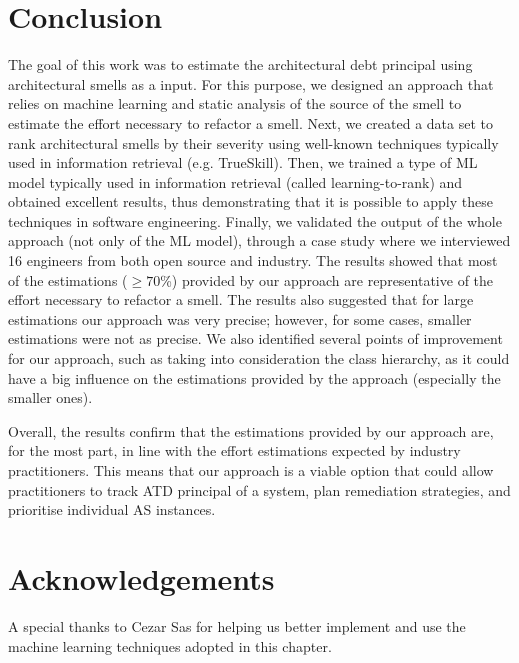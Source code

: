 
\section{Conclusion}\label{c6:sec:conclusion-fw}
The goal of this work was to estimate the architectural debt principal using architectural smells as a input.
For this purpose, we designed an approach that relies on machine learning and static analysis of the source of the smell to estimate the effort necessary to refactor a smell.
Next, we created a data set to rank architectural smells by their severity using well-known techniques typically used in information retrieval (e.g. TrueSkill).
Then, we trained a type of ML model typically used in information retrieval (called learning-to-rank) and obtained excellent results, thus demonstrating that it is possible to apply these techniques in software engineering.
Finally, we validated the output of the whole approach (not only of the ML model), through a case study where we interviewed 16 engineers from both open source and industry.
The results showed that most of the estimations ($\ge 70$\%) provided by our approach are representative of the effort necessary to refactor a smell.
The results also suggested that for large estimations our approach was very precise; however, for some cases, smaller estimations were not as precise.
We also identified several points of improvement for our approach, such as taking into consideration the class hierarchy, as it could have a big influence on the estimations provided by the approach (especially the smaller ones).

Overall, the results confirm that the estimations provided by our approach are, for the most part, in line with the effort estimations expected by industry practitioners.
This means that our approach is a viable option that could allow practitioners to track ATD principal of a system, plan remediation strategies, and prioritise individual AS instances.

\section*{Acknowledgements}
A special thanks to Cezar Sas for helping us better implement and use the machine learning techniques adopted in this chapter.

